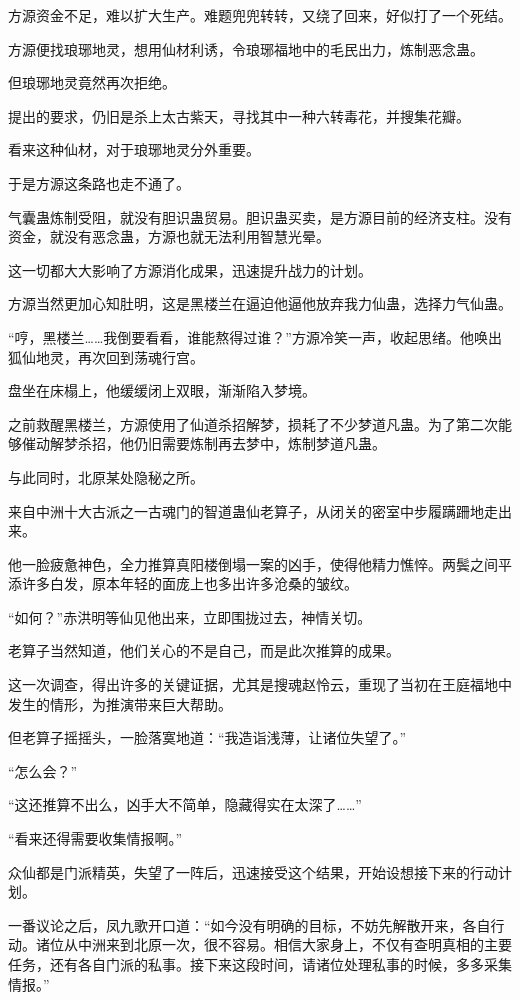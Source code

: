 \begin{this_body}
方源资金不足，难以扩大生产。难题兜兜转转，又绕了回来，好似打了一个死结。

方源便找琅琊地灵，想用仙材利诱，令琅琊福地中的毛民出力，炼制恶念蛊。

但琅琊地灵竟然再次拒绝。

提出的要求，仍旧是杀上太古紫天，寻找其中一种六转毒花，并搜集花瓣。

看来这种仙材，对于琅琊地灵分外重要。

于是方源这条路也走不通了。

气囊蛊炼制受阻，就没有胆识蛊贸易。胆识蛊买卖，是方源目前的经济支柱。没有资金，就没有恶念蛊，方源也就无法利用智慧光晕。

这一切都大大影响了方源消化成果，迅速提升战力的计划。

方源当然更加心知肚明，这是黑楼兰在逼迫他逼他放弃我力仙蛊，选择力气仙蛊。

“哼，黑楼兰……我倒要看看，谁能熬得过谁？”方源冷笑一声，收起思绪。他唤出狐仙地灵，再次回到荡魂行宫。

盘坐在床榻上，他缓缓闭上双眼，渐渐陷入梦境。

之前救醒黑楼兰，方源使用了仙道杀招解梦，损耗了不少梦道凡蛊。为了第二次能够催动解梦杀招，他仍旧需要炼制再去梦中，炼制梦道凡蛊。

与此同时，北原某处隐秘之所。

来自中洲十大古派之一古魂门的智道蛊仙老算子，从闭关的密室中步履蹒跚地走出来。

他一脸疲惫神色，全力推算真阳楼倒塌一案的凶手，使得他精力憔悴。两鬓之间平添许多白发，原本年轻的面庞上也多出许多沧桑的皱纹。

“如何？”赤洪明等仙见他出来，立即围拢过去，神情关切。

老算子当然知道，他们关心的不是自己，而是此次推算的成果。

这一次调查，得出许多的关键证据，尤其是搜魂赵怜云，重现了当初在王庭福地中发生的情形，为推演带来巨大帮助。

但老算子摇摇头，一脸落寞地道：“我造诣浅薄，让诸位失望了。”

“怎么会？”

“这还推算不出么，凶手大不简单，隐藏得实在太深了……”

“看来还得需要收集情报啊。”

众仙都是门派精英，失望了一阵后，迅速接受这个结果，开始设想接下来的行动计划。

一番议论之后，凤九歌开口道：“如今没有明确的目标，不妨先解散开来，各自行动。诸位从中洲来到北原一次，很不容易。相信大家身上，不仅有查明真相的主要任务，还有各自门派的私事。接下来这段时间，请诸位处理私事的时候，多多采集情报。”


\end{this_body}
